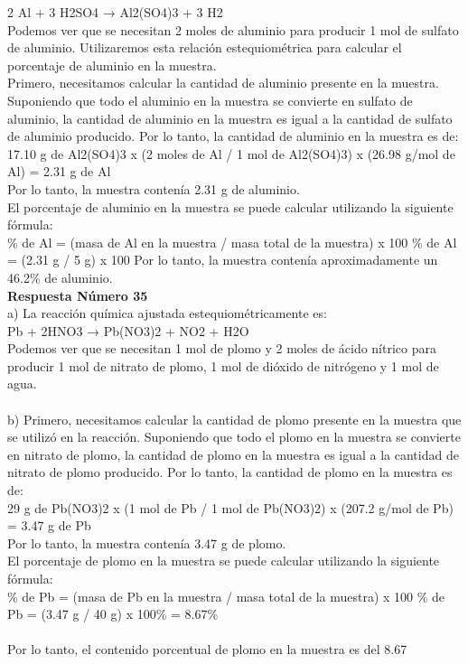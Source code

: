 \documentclass{article}
\begin{document}
2 Al + 3 H2SO4 → Al2(SO4)3 + 3 H2\\
Podemos ver que se necesitan 2 moles de aluminio para producir 1 mol de sulfato de aluminio. Utilizaremos esta relación estequiométrica para calcular el porcentaje de aluminio en la muestra.\\
Primero, necesitamos calcular la cantidad de aluminio presente en la muestra. Suponiendo que todo el aluminio en la muestra se convierte en sulfato de aluminio, la cantidad de aluminio en la muestra es igual a la cantidad de sulfato de aluminio producido. Por lo tanto, la cantidad de aluminio en la muestra es de:\\
17.10 g de Al2(SO4)3 x (2 moles de Al / 1 mol de Al2(SO4)3) x (26.98 g/mol de Al) = 2.31 g de Al\\
Por lo tanto, la muestra contenía 2.31 g de aluminio.\\
El porcentaje de aluminio en la muestra se puede calcular utilizando la siguiente fórmula:\\
\% de Al = (masa de Al en la muestra / masa total de la muestra) x 100%
\% de Al = (2.31 g / 5 g) x 100%
Por lo tanto, la muestra contenía aproximadamente un 46.2\% de aluminio.\\
\textbf{Respuesta Número 35} \\
a) La reacción química ajustada estequiométricamente es:\\
Pb + 2HNO3 → Pb(NO3)2 + NO2 + H2O\\
Podemos ver que se necesitan 1 mol de plomo y 2 moles de ácido nítrico para producir 1 mol de nitrato de plomo, 1 mol de dióxido de nitrógeno y 1 mol de agua.\\
\\
b) Primero, necesitamos calcular la cantidad de plomo presente en la muestra que se utilizó en la reacción. Suponiendo que todo el plomo en la muestra se convierte en nitrato de plomo, la cantidad de plomo en la muestra es igual a la cantidad de nitrato de plomo producido. Por lo tanto, la cantidad de plomo en la muestra es de:\\
29 g de Pb(NO3)2 x (1 mol de Pb / 1 mol de Pb(NO3)2) x (207.2 g/mol de Pb) = 3.47 g de Pb\\
Por lo tanto, la muestra contenía 3.47 g de plomo.\\
El porcentaje de plomo en la muestra se puede calcular utilizando la siguiente fórmula:\\
\% de Pb = (masa de Pb en la muestra / masa total de la muestra) x 100%
\% de Pb = (3.47 g / 40 g) x 100\% = 8.67\%\\
\\
Por lo tanto, el contenido porcentual de plomo en la muestra es del 8.67%
\end{document}
